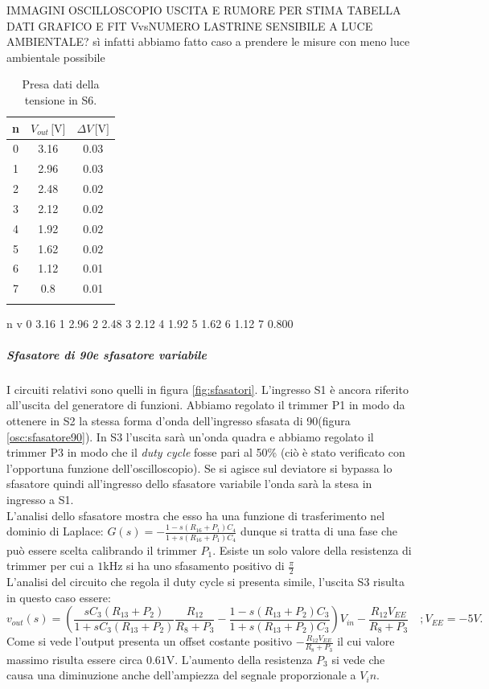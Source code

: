\documentclass[10pt,a4paper]{article}
\begin{document}
IMMAGINI OSCILLOSCOPIO USCITA E RUMORE PER STIMA
TABELLA DATI
GRAFICO E FIT VvsNUMERO LASTRINE
SENSIBILE A LUCE AMBIENTALE? sì infatti abbiamo fatto caso a prendere le misure con meno luce ambientale possibile
\begin{table}
\centering
\begin{tabular}{c|c|c}
\hline
n	&	$V_{out}\,\mbox{[V]}$	&	$\Delta V\,\mbox{[V]}$\\
\hline
0 &  3.16  &  0.03\\
\hline
1  & 2.96  &  0.03\\
\hline
2 &  2.48  &  0.02\\
\hline
3  & 2.12   & 0.02\\
\hline
4   &1.92   & 0.02\\
\hline
5   &1.62    &0.02\\
\hline
6   &1.12   & 0.01\\
\hline
7   &0.8    & 0.01\\
\hline
\caption{Presa dati della tensione in S6.\label{tab:abs1}}
\end{tabular}
\end{table}
n	v
0	3.16
1	2.96
2	2.48
3	2.12
4	1.92
5	1.62
6	1.12
7	0.800


\subparagraph{Sfasatore di 90\degree e sfasatore variabile}
I circuiti relativi sono quelli in figura \ref{fig:sfasatori}. L'ingresso S1 è ancora riferito all'uscita del generatore di funzioni. Abbiamo regolato il trimmer P1 in modo da ottenere in S2 la stessa forma d'onda dell'ingresso sfasata di 90\degree (figura \ref{osc:sfasatore90}). In S3 l'uscita sarà un'onda quadra e abbiamo regolato il trimmer P3 in modo che il \emph{duty cycle} fosse pari al 50\% (ciò è stato verificato con l'opportuna funzione dell'oscilloscopio). Se si agisce sul deviatore si bypassa lo sfasatore quindi all'ingresso dello sfasatore variabile l'onda sarà la stesa in ingresso a S1.\\
L'analisi dello sfasatore mostra che esso ha una funzione di trasferimento nel dominio di Laplace: $G(s) = -\frac{1-s(R_{16} +P_1) C_{4}}{1+s(R_{16} + P_1)C_{4}}$ dunque si tratta di una fase che può essere scelta calibrando il trimmer $P_1$. Esiste un solo valore della resistenza di trimmer per cui a $1$kHz si ha uno sfasamento positivo di $\frac{\pi}{2}$\\
L'analisi del circuito che regola il duty cycle si presenta simile, l'uscita S3 risulta in questo caso essere:
\begin{equation}
v_{out}(s) = \left( \frac{s C_3 (R_{13} + P_2)}{1 + s C_3 (R_{13} + P_2)} \frac{R_{12}}{R_8+P_3} -\frac{1-s(R_{13} +P_2) C_{3}}{1+s(R_{13} + P_2)C_{3}} \right) V_{in}-\frac{R_{12} V_{EE}}{R_8+P_3}
\, \, \, \, \, \, ; V_{EE} = -5V.
\end{equation}
Come si vede l'output presenta un offset costante positivo $-\frac{R_{12} V_{EE}}{R_8+P_3}$ il cui valore massimo risulta essere circa $0.61$V. L'aumento della resistenza $P_3$ si vede che causa una diminuzione anche dell'ampiezza del segnale proporzionale a $V_in$. 
\end{document}
